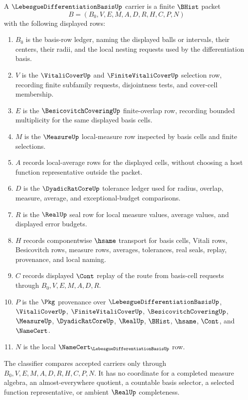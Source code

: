 \begin{definition}
\label{def:lebesgue-differentiation-basis-carrier}
A $\LebesgueDifferentiationBasisUp$ carrier is a finite $\BHist$ packet
$$
B=(B_0,V,E,M,A,D,R,H,C,P,N)
$$
with the following displayed rows:
\begin{enumerate}
\item $B_0$ is the basis-row ledger, naming the displayed balls or intervals, their centers, their radii, and the local nesting requests used by the differentiation basis.
\item $V$ is the $\VitaliCoverUp$ and $\FiniteVitaliCoverUp$ selection row, recording finite subfamily requests, disjointness tests, and cover-cell membership.
\item $E$ is the $\BesicovitchCoveringUp$ finite-overlap row, recording bounded multiplicity for the same displayed basis cells.
\item $M$ is the $\MeasureUp$ local-measure row inspected by basis cells and finite selections.
\item $A$ records local-average rows for the displayed cells, without choosing a host function representative outside the packet.
\item $D$ is the $\DyadicRatCoreUp$ tolerance ledger used for radius, overlap, measure, average, and exceptional-budget comparisons.
\item $R$ is the $\RealUp$ seal row for local measure values, average values, and displayed error budgets.
\item $H$ records componentwise $\hsame$ transport for basis cells, Vitali rows, Besicovitch rows, measure rows, averages, tolerances, real seals, replay, provenance, and local naming.
\item $C$ records displayed $\Cont$ replay of the route from basis-cell requests through $B_0,V,E,M,A,D,R$.
\item $P$ is the $\Pkg$ provenance over $\LebesgueDifferentiationBasisUp$, $\VitaliCoverUp$, $\FiniteVitaliCoverUp$, $\BesicovitchCoveringUp$, $\MeasureUp$, $\DyadicRatCoreUp$, $\RealUp$, $\BHist$, $\hsame$, $\Cont$, and $\NameCert$.
\item $N$ is the local $\NameCert_{\LebesgueDifferentiationBasisUp}$ row.
\end{enumerate}
The classifier compares accepted carriers only through $B_0,V,E,M,A,D,R,H,C,P,N$. It has no coordinate for a completed measure algebra, an almost-everywhere quotient, a countable basis selector, a selected function representative, or ambient $\RealUp$ completeness.
\end{definition}

